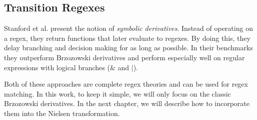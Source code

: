 \subsection{Transition Regexes}
Stanford et al. \cite{transition-regex} present the notion of \textit{symbolic derivatives}. Instead of operating on a regex, they return functions that later evaluate to regexes. By doing this, they delay branching and decision making for as long as possible. In their benchmarks they outperform Brzozowski derivatives and perform especially well on regular expressions with logical branches ($\&$ and $|$).

Both of these approaches are complete regex theories and can be used for regex matching. In this work, to keep it simple, we will only focus on the classic Brzozowski derivatives. In the next chapter, we will describe how to incorporate them into the Nielsen transformation.